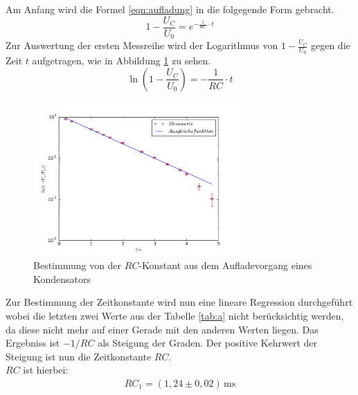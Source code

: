 Am Anfang wird die Formel \eqref{eqn:aufladung} in die folgegende
Form gebracht.
\begin{equation}
1-\frac{U_C}{U_0}=e^{-{\frac{1}{RC}\cdot t}}
\end{equation}
Zur Auswertung der ersten Messreihe wird der Logarithmus
von $1-\frac{U_C}{U_0}$ gegen die Zeit $t$ aufgetragen, wie in Abbildung \ref{abb:a} zu sehen.
\begin{equation}
  \ln \left(1-\frac{U_C}{U_0}\right)=-\frac{1}{RC}\cdot t
\end{equation}
\begin{figure}[!h]
  \centering
  \includegraphics[width=0.7\textwidth]{a.pdf}
  \caption{Bestimmung von der $RC$-Konstant aus dem
  Aufladevorgang eines Kondensators}
\label{abb:a}
\end{figure}
\FloatBarrier
Zur Bestimmung der Zeitkonstante wird nun eine lineare Regression
durchgeführt wobei die letzten zwei Werte aus der
Tabelle \ref{tab:a} nicht berücksichtig werden,
da diese nicht mehr auf einer Gerade mit den anderen Werten liegen.
Das Ergebniss ist $-1/RC$ als Steigung der Graden.
Der positive Kehrwert der Steigung ist nun die Zeitkonstante $RC$.\\
$RC$ ist hierbei:
\begin{align*}
RC_\mathrm{1}=(1,24\pm0,02)\,\si{\milli\second}
\end{align*}
